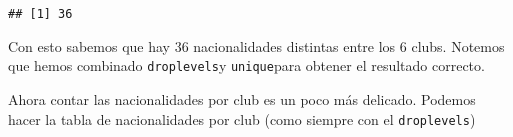 \documentclass[
]{article}
\newenvironment{Shaded}{\begin{snugshade}}{\end{snugshade}}
\newcommand{\CommentTok}[1]{\textcolor[rgb]{0.56,0.35,0.01}{\textit{#1}}}
\newcommand{\KeywordTok}[1]{\textcolor[rgb]{0.13,0.29,0.53}{\textbf{#1}}}
\newcommand{\NormalTok}[1]{#1}
\newcommand{\OperatorTok}[1]{\textcolor[rgb]{0.81,0.36,0.00}{\textbf{#1}}}
\begin{document}
\begin{Shaded}
\end{Shaded}

\begin{verbatim}
## [1] 36
\end{verbatim}

Con esto sabemos que hay 36 nacionalidades distintas entre los 6 clubs.
Notemos que hemos combinado \texttt{droplevels}y \texttt{unique}para
obtener el resultado correcto.

Ahora contar las nacionalidades por club es un poco más delicado.
Podemos hacer la tabla de nacionalidades por club (como siempre con el
\texttt{droplevels})

\begin{Shaded}
\end{Shaded}
\end{document}
